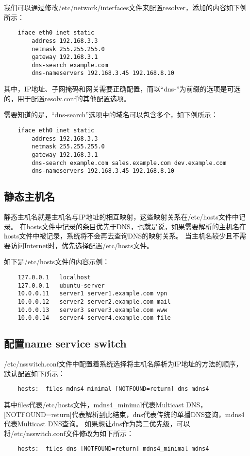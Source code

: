 \documentclass[a4paper,left=2.5cm,right=2.5cm,11pt]{article}
\begin{document}
	我们可以通过修改/etc/network/interfaces文件来配置resolver，添加的内容如下例所示：
	\begin{lstlisting}
	iface eth0 inet static
		address 192.168.3.3
		netmask 255.255.255.0
		gateway 192.168.3.1
		dns-search example.com
		dns-nameservers 192.168.3.45 192.168.8.10
	\end{lstlisting}

	其中，IP地址、子网掩码和网关需要正确配置，而以“dns-”为前缀的选项是可选的，用于配置resolv.conf的其他配置选项。\par

	需要知道的是，“dns-search”选项中的域名可以包含多个，如下例所示：
	\begin{lstlisting}
	iface eth0 inet static
		address 192.168.3.3
		netmask 255.255.255.0
		gateway 192.168.3.1
		dns-search example.com sales.example.com dev.example.com
		dns-nameservers 192.168.3.45 192.168.8.10
	\end{lstlisting}

\subsection{静态主机名}
	静态主机名就是主机名与IP地址的相互映射，这些映射关系在/etc/hosts文件中记录。
	在hosts文件中记录的条目优先于DNS，也就是说，如果需要解析的主机名在hosts文件中被记录，系统将不会再去查询DNS的映射关系。
	当主机名较少且不需要访问Internet时，优先选择配置/etc/hosts文件。\par

	如下是/etc/hosts文件的内容示例：
	\begin{lstlisting}
	127.0.0.1	localhost
	127.0.0.1	ubuntu-server
	10.0.0.11	server1 server1.example.com vpn
	10.0.0.12	server2 server2.example.com mail
	10.0.0.13	server3 server3.example.com www
	10.0.0.14	server4 server4.example.com file
	\end{lstlisting}

\subsection{配置name service switch}
	/etc/nsswitch.conf文件中配置着系统选择将主机名解析为IP地址的方法的顺序，默认配置如下所示：
	\begin{lstlisting}
	hosts:	files mdns4_minimal [NOTFOUND=return] dns mdns4
	\end{lstlisting}

	其中files代表/etc/hosts文件，mdns4\_minimal代表Multicast DNS，[NOTFOUND=return]代表解析到此结束，dns代表传统的单播DNS查询，mdns4代表Multicast DNS查询。
	如果想让dns作为第二优先级，可以将/etc/nsswitch.conf文件修改为如下所示：
	\begin{lstlisting}
	hosts:	files dns [NOTFOUND=return] mdns4_minimal mdns4
	\end{lstlisting}
\end{document}
